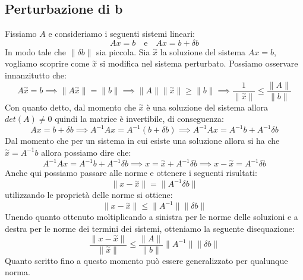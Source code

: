 \subsection{Perturbazione di b}
Fissiamo $A$ e consideriamo i seguenti sistemi lineari:
\begin{equation*}
    Ax=b \quad \text{e} \quad Ax=b+\delta b
\end{equation*}
In modo tale che $\|\delta b\|$ sia piccola. Sia $\stackrel{\sim }{x}$ la soluzione
del sistema $Ax=b$, vogliamo scoprire come $\stackrel{\sim}{x}$ si modifica nel
sistema perturbato. Possiamo osservare innanzitutto che:
\begin{equation}
    A\stackrel{\sim}{x}=b \implies \|A\stackrel{\sim}{x}\|=\|b\|\implies \|A\|\|
    \stackrel{\sim}{x}\|\geq \|b\|\implies\frac{1}{\|\stackrel{\sim}{x}\|} \leq \frac{\|A\|}{\|b\|}
\end{equation}
Con quanto detto, dal momento che $\stackrel{\sim}{x}$ è una soluzione del sistema
allora $det(A) \neq 0$ quindi la matrice è invertibile, di conseguenza:
\begin{equation}
    Ax = b + \delta b \implies A^{-1} Ax = A^{-1}(b + \delta b) \implies A^{-1}
    Ax = A^{-1} b + A^{-1} \delta b
\end{equation}
Dal momento che per un sistema in cui esiste una soluzione allora si ha che
$\stackrel{\sim}{x}= A^{-1}b$ allora possiamo dire che:
\begin{equation}
    A^{-1}Ax = A^{-1}b+A^{-1}\delta b\implies x = \stackrel{\sim}{x}+A^{-1}\delta
    b\implies x - \stackrel{\sim}{x} = A^{-1}\delta b
\end{equation}
Anche qui possiamo passare alle norme e ottenere i seguenti risultati:
\begin{equation}
    \|x - \stackrel{\sim}{x} \| = \|A^{-1}\delta b\|
\end{equation}
utilizzando le proprietà delle norme si ottiene:
\begin{equation}
    \|x - \stackrel{\sim}{x} \| \leq \|A^{-1}\|\|\delta b\|
\end{equation}
Unendo quanto ottenuto moltiplicando a sinistra per le norme delle soluzioni e a
destra per le norme dei termini dei sistemi, otteniamo la seguente disequazione:
\begin{equation}
    \frac{\|x - \stackrel{\sim}{x}\|}{\|\stackrel{\sim}{x}\|} \leq \frac{\|A\|}{\|b\|}
    \|A^{-1}\|\|\delta b\|
\end{equation}
Quanto scritto fino a questo momento può essere generalizzato per qualunque norma.
